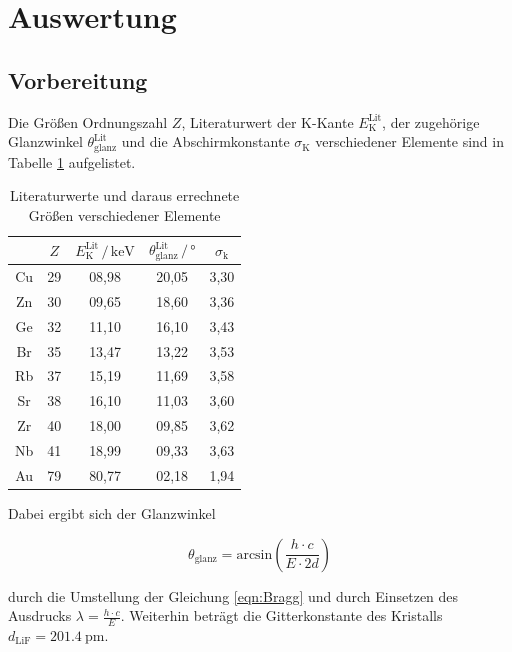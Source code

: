 \section{Auswertung}
\label{sec:Auswertung}

\subsection{Vorbereitung}

Die Größen Ordnungszahl $Z$, Literaturwert der
K-Kante $E_\text{K}^\text{Lit}$, der zugehörige Glanzwinkel 
$\theta_\text{glanz}^\text{Lit}$ und die Abschirmkonstante 
$\sigma_\text{K}$ verschiedener Elemente sind in Tabelle 
\ref{tab:literatur} aufgelistet.

\begin{table}
  \centering
  \caption{Literaturwerte und daraus errechnete Größen verschiedener Elemente}
  \label{tab:literatur}
  \begin{tabular}{c c c c c}
  \toprule
  $ $ & $Z$ & $E_\text{K}^\text{Lit} \,/\, \si{\kilo\eV}$
  & $\theta_\text{glanz}^\text{Lit} \,/\, \si{\degree}$ & 
  $\sigma_\text{k}$\\
  \midrule 
  Cu & 29 & 08,98 & 20,05 & 3,30 \\
  Zn & 30 & 09,65 & 18,60 & 3,36 \\
  Ge & 32 & 11,10 & 16,10 & 3,43 \\
  Br & 35 & 13,47 & 13,22 & 3,53 \\
  Rb & 37 & 15,19 & 11,69 & 3,58 \\
  Sr & 38 & 16,10 & 11,03 & 3,60 \\
  Zr & 40 & 18,00 & 09,85 & 3,62 \\
  Nb & 41 & 18,99 & 09,33 & 3,63 \\
  Au & 79 & 80,77 & 02,18 & 1,94 \\
  \bottomrule
  \end{tabular}
  \end{table}

Dabei ergibt sich der Glanzwinkel

  \begin{equation}
    \theta_\text{glanz} = \text{arcsin}\left(\frac{h \cdot c}{E \cdot 2d}\right)
    \label{eqn:theta}
  \end{equation}

  durch die Umstellung der Gleichung \eqref{eqn:Bragg} und durch Einsetzen 
  des Ausdrucks $\lambda = \frac{h \cdot c}{E}$. Weiterhin beträgt die Gitterkonstante
  des Kristalls $d_\text{LiF} = \SI{201.4}{\pico\meter}$.

